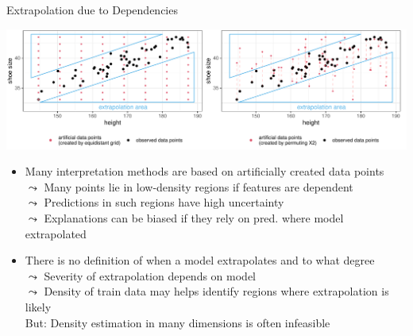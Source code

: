 \documentclass[11pt,compress,t,notes=noshow, aspectratio=169, xcolor=table]{beamer}
\begin{document}
\begin{frame}{Extrapolation due to Dependencies}
\centerline{\includegraphics[width=\textwidth]{figure/extrapolation}}

\begin{itemize}
\item Many interpretation methods are based on
artificially created data points \\
$\leadsto$ Many points lie in low-density regions if features are dependent\\
$\leadsto$ Predictions in such regions have high uncertainty\\ %
$\leadsto$ Explanations can be biased if they rely on pred. where model extrapolated\\
\pause
\item There is no definition of when a model extrapolates and to what degree \\
$\leadsto$ Severity of extrapolation depends on model %
\\
$\leadsto$ Density of train data may helps identify regions where extrapolation is likely \\
\phantom{$\leadsto$} But: Density estimation in many dimensions is often infeasible
\end{itemize}

\end{frame}
\end{document}
